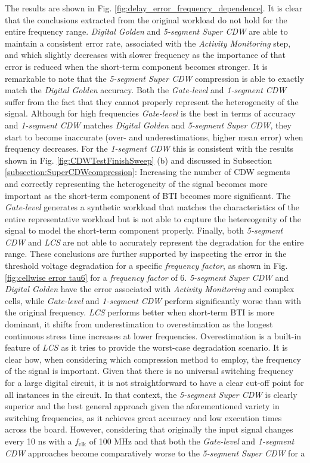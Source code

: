 The results are shown in Fig. \ref{fig:delay_error_frequency_dependence}. It is clear that the conclusions extracted from the original workload do not hold for the entire frequency range. \textit{Digital Golden} and \textit{5-segment Super CDW} are able to maintain a consistent error rate, associated with the \textit{Activity Monitoring} step, and which slightly decreases with slower frequency as the importance of that error is reduced when the short-term component becomes stronger. It is remarkable to note that the \textit{5-segment Super CDW} compression is able to exactly match the \textit{Digital Golden} accuracy. Both the \textit{Gate-level} and \textit{1-segment CDW} suffer from the fact that they cannot properly represent the heterogeneity of the signal. Although for high frequencies \textit{Gate-level} is the best in terms of accuracy and \textit{1-segment CDW} matches \textit{Digital Golden} and \textit{5-segment Super CDW}, they start to become inaccurate (over- and underestimations, higher mean error) when frequency decreases. For the \textit{1-segment CDW} this is consistent with the results shown in Fig. \ref{fig:CDWTestFinishSweep} (b) and discussed in Subsection \ref{subsection:SuperCDWcompression}: Increasing the number of CDW segments and correctly representing the heterogeneity of the signal becomes more important as the short-term component of \gls{BTI} becomes more significant. The \textit{Gate-level} generates a synthetic workload that matches the characteristics of the entire representative workload but is not able to capture the hetereogenity of the signal to model the short-term component properly. Finally, both \textit{5-segment CDW} and \textit{LCS} are not able to accurately represent the degradation for the entire range. These conclusions are further supported by inspecting the error in the threshold voltage degradation for a specific \textit{frequency factor}, as shown in Fig. \ref{fig:cellwise error tau6} for a \textit{frequency factor} of 6. \textit{5-segment Super CDW} and \textit{Digital Golden} have the error associated with \textit{Activity Monitoring} and complex cells, while \textit{Gate-level} and \textit{1-segment CDW} perform significantly worse than with the original frequency. \textit{LCS} performs better when short-term \gls{BTI} is more dominant, it shifts from underestimation to overestimation as the longest continuous stress time increases at lower frequencies. Overestimation is a built-in feature of \textit{LCS} as it tries to provide the worst-case degradation scenario. It is clear how, when considering which compression method to employ, the frequency of the signal is important. Given that there is no universal switching frequency for a large digital circuit, it is not straightforward to have a clear cut-off point for all instances in the circuit. In that context, the \textit{5-segment Super CDW} is clearly superior and the best general approach given the aforementioned variety in switching frequencies, as it achieves great accuracy and low execution times across the board. However, considering that originally the input signal changes every 10 ns with a $f_\text{clk}$ of 100 MHz and that both the \textit{Gate-level} and \textit{1-segment CDW} approaches become comparatively worse to the \textit{5-segment Super CDW} for a 